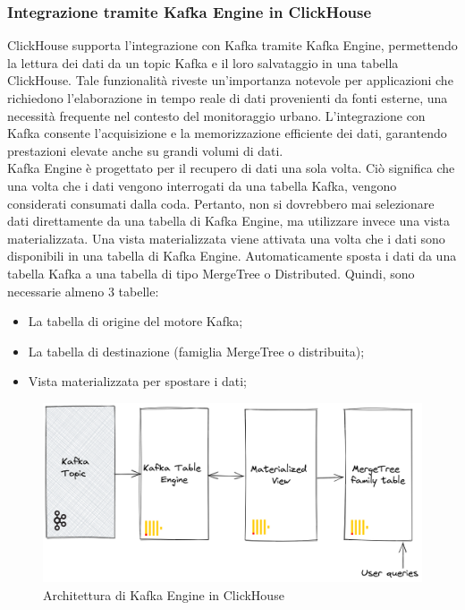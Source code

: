 \subsubsection{Integrazione tramite Kafka Engine in ClickHouse}
ClickHouse supporta l'integrazione con Kafka tramite Kafka Engine, permettendo la lettura dei dati da un topic Kafka e il loro salvataggio in una tabella ClickHouse. Tale funzionalità riveste un'importanza notevole per applicazioni che richiedono l'elaborazione in tempo reale di dati provenienti da fonti esterne, una necessità frequente nel contesto del monitoraggio urbano. L'integrazione con Kafka consente l'acquisizione e la memorizzazione efficiente dei dati, garantendo prestazioni elevate anche su grandi volumi di dati.\\
Kafka Engine è progettato per il recupero di dati una sola volta. Ciò significa che una volta che i dati vengono interrogati da una tabella Kafka, vengono considerati consumati dalla coda. Pertanto, non si dovrebbero mai selezionare dati direttamente da una tabella di Kafka Engine, ma utilizzare invece una vista materializzata. Una vista materializzata viene attivata una volta che i dati sono disponibili in una tabella di Kafka Engine. Automaticamente sposta i dati da una tabella Kafka a una tabella di tipo MergeTree o Distributed. Quindi, sono necessarie almeno 3 tabelle:
\begin{itemize}
  \item La tabella di origine del motore Kafka;
  \item La tabella di destinazione (famiglia MergeTree o distribuita);
  \item Vista materializzata per spostare i dati;
\end{itemize}
\begin{figure}[H]
  \centering
  \includegraphics[width=.7\textwidth]{../Images/SpecificaTecnica/kafka_engine_architecture.png}
  \caption{Architettura di Kafka Engine in ClickHouse}
  \label{fig:sensorKafka}
\end{figure}

